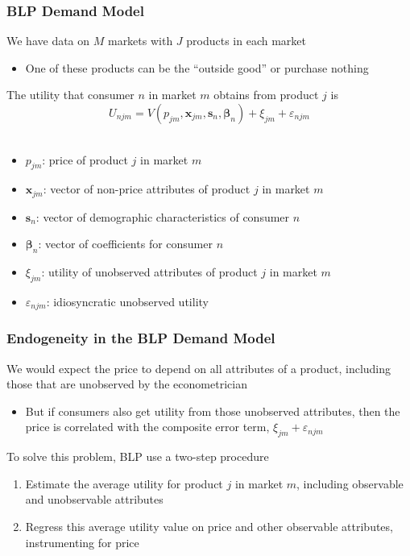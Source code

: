\documentclass{beamer}
\begin{document}
\begin{frame}\frametitle{BLP Demand Model}
    We have data on $M$ markets with $J$ products in each market
    \begin{itemize}
        \item One of these products can be the ``outside good'' or purchase nothing
    \end{itemize}
    \vspace{3ex}
    The utility that consumer $n$ in market $m$ obtains from product $j$ is
    $$U_{njm} = V(p_{jm}, \bm{x}_{jm}, \bm{s}_n, \bm{\beta}_n) + \xi_{jm} + \varepsilon_{njm}$$ \\
    \vspace{-1ex}
    \begin{itemize}
        \item $p_{jm}$: price of product $j$ in market $m$
        \item $\bm{x}_{jm}$: vector of non-price attributes of product $j$ in market $m$
        \item $\bm{s}_n$: vector of demographic characteristics of consumer $n$
        \item $\bm{\beta}_n$: vector of coefficients for consumer $n$
        \item $\xi_{jm}$: utility of unobserved attributes of product $j$ in market $m$
        \item $\varepsilon_{njm}$: idiosyncratic unobserved utility
    \end{itemize}
\end{frame}

\begin{frame}\frametitle{Endogeneity in the BLP Demand Model}
    We would expect the price to depend on all attributes of a product, including those that are unobserved by the econometrician
    \begin{itemize}
        \item But if consumers also get utility from those unobserved attributes, then the price is correlated with the composite error term, $\xi_{jm} + \varepsilon_{njm}$
    \end{itemize}
    \vspace{3ex}
    To solve this problem, BLP use a two-step procedure
    \begin{enumerate}
        \item Estimate the average utility for product $j$ in market $m$, including observable and unobservable attributes
        \item Regress this average utility value on price and other observable attributes, instrumenting for price 
    \end{enumerate}
\end{frame}
\end{document}
